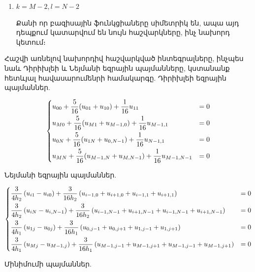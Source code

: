 \documentclass[fleqn, bachelor,subf,12pt,notitlepage]{article}
\begin{document}
\begin{enumerate}
\item{$k=M-2, l=N-2$}

Քանի որ բազիսային ֆունկցիաները սիմետրիկ են, ապա այդ դեպքում կատարվում են նույն հաշվարկները, ինչ նախորդ կետում։
\end{enumerate}

Հաշվի առնելով նախորդիվ հաշվարկված ինտեգրալները, ինչպես նաև Դիրիխլեի և Նեյմանի եզրային պայմանները, կստանանք հետևյալ հավասարումենրի համակարգը.
\noindent Դիրիխլեի եզրային պայմաններ.

$$\begin{dcases}
u_{00}+\frac{5}{16}(u_{01} + u_{10}) +\frac{1}{16}u_{11} &= 0\\
u_{M0}+\frac{5}{16}(u_{M1} + u_{M-1,0}) +\frac{1}{16}u_{M-1, 1} &= 0\\
u_{0N}+\frac{5}{16}(u_{1N} + u_{0,N-1}) +\frac{1}{16}u_{N-1, 1} &= 0\\
u_{MN}+\frac{5}{16}(u_{M-1,N} + u_{M,N-1}) +\frac{1}{16}u_{M-1,N-1} &= 0
\end{dcases}$$

\noindent Նեյմանի եզրային պայմաններ.

$$\begin{dcases}
\dfrac{3}{4h_{2}}\left(u_{i1} - u_{i0}\right) + \dfrac{3}{16h_{2}}\left(u_{i-1, 0}+u_{i+1, 0}+u_{i-1, 1}+u_{i+1, 1}\right)&=0\\
\dfrac{3}{4h_{2}}\left(u_{iN} - u_{i, N-1}\right) + \dfrac{3}{16h_{2}}\left(u_{i-1, N-1}+u_{i+1, N-1}+u_{i-1, N-1}+u_{i+1, N-1}\right)&=0\\
\dfrac{3}{4h_{1}}\left(u_{1j} - u_{0j}\right) + \dfrac{3}{16h_{1}}\left(u_{0, j-1}+u_{0, j+1}+u_{1, j-1}+u_{1, j+1}\right)&=0\\
\dfrac{3}{4h_{1}}\left(u_{Mj} - u_{M-1,j}\right) + \dfrac{3}{16h_{1}}\left(u_{M-1,j-1}+u_{M-1, j+1}+u_{M-1, j-1}+u_{M-1, j+1}\right)&=0\\
\end{dcases}$$

\noindent Մինիմումի պայմաններ.
\end{document}
